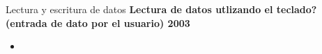 \begin{frame}[fragile]{Lectura y escritura de datos}
  \textbf{Lectura de datos utlizando el teclado? (entrada de dato por el usuario) 2003}
 \begin{itemize}[<+(1)->]
  \item 
 \end{itemize}   
\end{frame}
